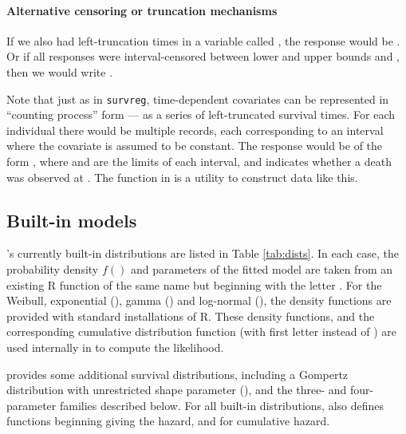\documentclass[nojss,nofooter]{jss}
\begin{document}
\paragraph{Alternative censoring or truncation mechanisms} 

If we also had left-truncation times in a variable called
, the response would be 
.  Or if all responses were
interval-censored between lower and upper bounds  and
, then we would write
.  

Note that just as in \texttt{survreg}, time-dependent covariates can
be represented in ``counting process'' form --- as a series of
left-truncated survival times.  For each individual there would be
multiple records, each corresponding to an interval where the
covariate is assumed to be constant.  The response would be of the
form , where  and
 are the limits of each interval, and 
indicates whether a death was observed at .  The function
 in  is a utility to construct data like
this.


\subsection{Built-in models}

's currently built-in distributions are listed in
Table \ref{tab:dists}.  In each case, the probability density $f()$
and parameters of the fitted model are taken from an existing R
function of the same name but beginning with the letter .  For
the Weibull, exponential (), gamma () and
log-normal (), the density functions are provided with
standard installations of R.  These density functions, and the
corresponding cumulative distribution function (with first letter
 instead of ) are used internally in
 to compute the likelihood.

 provides some additional survival distributions,
including a Gompertz distribution with unrestricted shape parameter
(), and the three- and four-parameter families
described below.  For all built-in distributions,  also
defines functions beginning  giving the hazard, and 
for cumulative hazard.
\end{document}
